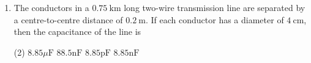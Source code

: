 \begin{enumerate} [label=\color{ocre}\textbf{\arabic*.}]
\begin{answer}
		\begin{align*}
		\frac{d k}{d x}=\alpha \\
		d k=\alpha d x \\
		k=\alpha x+\beta
		\end{align*}
		Now, at $x=0, k=k_{1}$ and at $x={d}, k=k_{2}$
		\\$k=\frac{\left(k_{2}-k_{1}\right) x}{d}+k_{1}$
		Now the the field at $P$ is
		\begin{align*}
		E &=\frac{\sigma}{\varepsilon}=\frac{\sigma}{\varepsilon_{0} k}=\frac{\sigma}{\varepsilon_{0}\left[\frac{\left(k_{2}-k_{1}\right) x}{d}+k_{1}\right]} \\
		V &=-\int_{d}^{0} E d x=\frac{\sigma}{\varepsilon_{0}} \int_{0}^{d} \frac{d x}{\left.\left(k_{2}-k_{1}\right) x_{1}\right)_{1}} \frac{\sigma_{1}}{d} \\
		&=\left.\frac{\sigma d}{\varepsilon_{0}\left(k_{2}-k_{1}\right)} \ln \left(\frac{k_{2}-k_{1}}{d} x+k_{1}\right)\right|_{0} ^{d}\\
		&=\frac{\sigma d}{\varepsilon_{0}\left(k_{2}-k_{1}\right)} \ln \left(\frac{k_{2}-k_{1}+k_{1}}{k_{1}}\right)\\&=\frac{Q d}{\varepsilon_{0} A\left(k_{2}-k_{1}\right)} \ln \left(\frac{k_{2}}{k_{1}}\right) \\
		c&=\frac{Q}{V}=\frac{\varepsilon_{0} A}{d} \frac{\left(k_{2}-k_{1}\right)}{\ln \left(k_{2} / k_{1}\right)}
		\end{align*}
	\end{answer}
	\item The conductors in a $0.75 \mathrm{~km}$ long two-wire transmission line are separated by a centre-to-centre distance of $0.2 \mathrm{~m}$. If each conductor has a diameter of $4 \mathrm{~cm}$, then the capacitance of the line is
	\begin{tasks}(2)
		\task[\textbf{a.}]$8.85 \mu \mathrm{F}$  
		\task[\textbf{b.}]$88.5 \mathrm{nF}$
		\task[\textbf{c.}]$8.85 \mathrm{pF}$ 
		\task[\textbf{d.}]$8.85 \mathrm{nF}$ 
	\end{tasks}
	

\end{enumerate}
